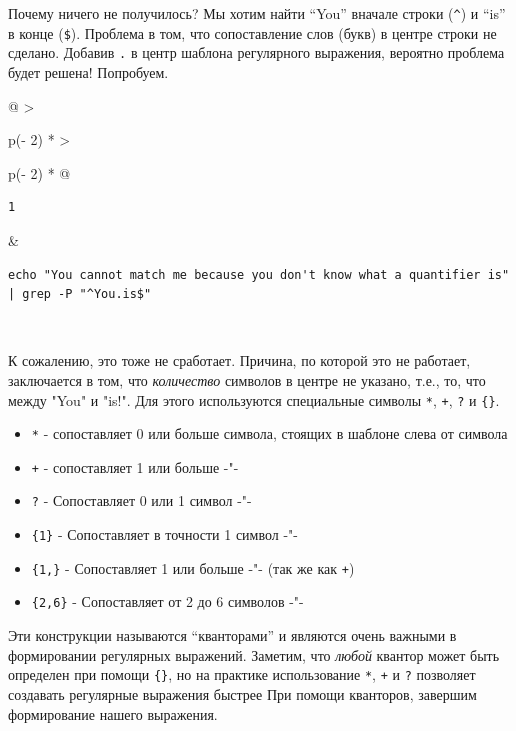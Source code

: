 \documentclass{report}
\begin{document}
Почему ничего не получилось? Мы хотим найти ``You'' вначале строки
(\texttt{\^{}}) и ``is'' в конце (\texttt{\$}). Проблема в том, что
сопоставление слов (букв) в центре строки не сделано. Добавив \texttt{.}
в центр шаблона регулярного выражения, вероятно проблема будет решена!
Попробуем.

\begin{longtable}[]{@{}
  >{\raggedright\arraybackslash}p{(\columnwidth - 2\tabcolsep) * }
  >{\raggedright\arraybackslash}p{(\columnwidth - 2\tabcolsep) * }@{}}
\toprule
\endhead
\begin{minipage}[t]{\linewidth}\raggedright
\begin{verbatim}
1
\end{verbatim}
\end{minipage} & \begin{minipage}[t]{\linewidth}\raggedright
\begin{verbatim}
echo "You cannot match me because you don't know what a quantifier is" | grep -P "^You.is$"
\end{verbatim}
\end{minipage} \\ \addlinespace
\bottomrule
\end{longtable}

К сожалению, это тоже не сработает. Причина, по которой это не работает,
заключается в том, что \emph{количество} символов в центре не указано,
т.е., то, что между "You" и "is!". Для этого используются специальные
символы \texttt{*}, \texttt{+}, \texttt{?} и \texttt{\{\}}.

\begin{itemize}
\tightlist
\item
  \texttt{*} - сопоставляет 0 или больше символа, стоящих в шаблоне
  слева от символа
\item
  \texttt{+} - сопоставляет 1 или больше -"-
\item
  \texttt{?} - Сопоставляет 0 или 1 символ -"-
\item
  \texttt{\{1\}} - Сопоставляет в точности 1 символ -"-
\item
  \texttt{\{1,\}} - Сопоставляет 1 или больше -"- (так же как
  \texttt{+})
\item
  \texttt{\{2,6\}} - Сопоставляет от 2 до 6 символов -"-
\end{itemize}

Эти конструкции называются ``кванторами'' и являются очень важными в
формировании регулярных выражений. Заметим, что \emph{любой} квантор
может быть определен при помощи \texttt{\{\}}, но на практике
использование \texttt{*}, \texttt{+} и \texttt{?} позволяет создавать
регулярные выражения быстрее При помощи кванторов, завершим формирование
нашего выражения.
\end{document}
